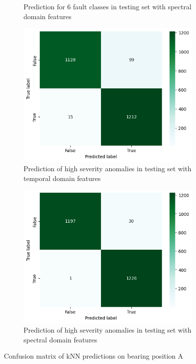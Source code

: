 \begin{figure}[ht]
\begin{subfigure}[b]{0.49\textwidth}
        \caption{Prediction for 6 fault classes in testing set with spectral domain features}
    \end{subfigure}
    \begin{subfigure}[b]{0.49\textwidth}
        \includegraphics[width=\textwidth]{assets/design/kNN-temporal-confusion-matrix-anomaly90.png}
        \caption{Prediction of high severity anomalies in testing set with temporal domain features}
    \end{subfigure}
    \hfill
    \begin{subfigure}[b]{0.49\textwidth}
        \includegraphics[width=\textwidth]{assets/design/kNN-spectral-confusion-matrix-anomaly90.png}
        \caption{Prediction of high severity anomalies in testing set with spectral domain features}
    \end{subfigure}
    \caption{Confusion matrix of kNN predictions on bearing position A}
    \label{fig:design:knn-confusion-matrix}
\end{figure}

